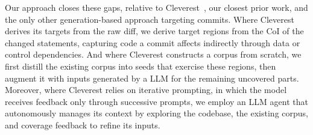 Our approach closes these gaps, relative to Cleverest~\cite{liuEvaluatingLLMBasedRegression2026}, our closest prior work, and the only other generation-based approach targeting commits.
Where Cleverest derives its targets from the raw diff, we derive target regions from the \ac{CoI} of the changed statements, capturing code a commit affects indirectly through data or control dependencies.
And where Cleverest constructs a corpus from scratch, we first distill the existing corpus into seeds that exercise these regions, then augment it with inputs generated by a \ac{LLM} for the remaining uncovered parts.
Moreover, where Cleverest relies on iterative prompting, in which the model receives feedback only through successive prompts, we employ an \ac{LLM} agent that autonomously manages its context by exploring the codebase, the existing corpus, and coverage feedback to refine its inputs.

\newcommand{\yes}{\ding{51}}
\newcommand{\no}{\ding{55}}
\newcommand{\na}{\textendash}

